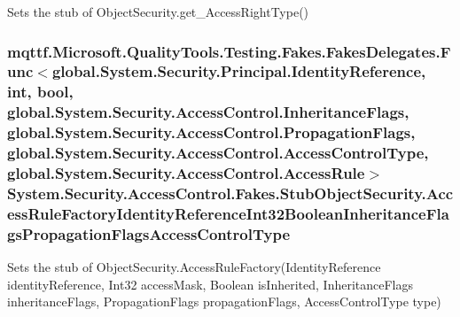 Sets the stub of Object\-Security.\-get\-\_\-\-Access\-Right\-Type()

\hypertarget{class_system_1_1_security_1_1_access_control_1_1_fakes_1_1_stub_object_security_af276d5543dbfd4ce548fcf1e22db291b}{
\subsubsection[{Access\-Rule\-Factory\-Identity\-Reference\-Int32\-Boolean\-Inheritance\-Flags\-Propagation\-Flags\-Access\-Control\-Type}]{\setlength{\rightskip}{0pt plus 5cm}mqttf.\-Microsoft.\-Quality\-Tools.\-Testing.\-Fakes.\-Fakes\-Delegates.\-Func$<$global.\-System.\-Security.\-Principal.\-Identity\-Reference, int, bool, global.\-System.\-Security.\-Access\-Control.\-Inheritance\-Flags, global.\-System.\-Security.\-Access\-Control.\-Propagation\-Flags, global.\-System.\-Security.\-Access\-Control.\-Access\-Control\-Type, global.\-System.\-Security.\-Access\-Control.\-Access\-Rule$>$ System.\-Security.\-Access\-Control.\-Fakes.\-Stub\-Object\-Security.\-Access\-Rule\-Factory\-Identity\-Reference\-Int32\-Boolean\-Inheritance\-Flags\-Propagation\-Flags\-Access\-Control\-Type}}\label{class_system_1_1_security_1_1_access_control_1_1_fakes_1_1_stub_object_security_af276d5543dbfd4ce548fcf1e22db291b}


Sets the stub of Object\-Security.\-Access\-Rule\-Factory(\-Identity\-Reference identity\-Reference, Int32 access\-Mask, Boolean is\-Inherited, Inheritance\-Flags inheritance\-Flags, Propagation\-Flags propagation\-Flags, Access\-Control\-Type type)

